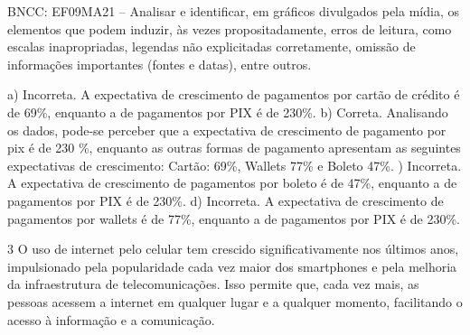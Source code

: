 \begin{escolha}
\begin{boxmedio}
\begin{boxmedio}
{\begin{boxpeq}
\begin{boxpeq}
{\begin{boxpeq}
\begin{boxmedio}
\begin{boxmedio}
\begin{boxpeq}
\begin{boxmedio}
\begin{boxpeq}
\begin{boxpeq}
\begin{boxpeq}
\begin{boxpeq}
\begin{boxmedio}
{\begin{boxmedio}
\begin{boxmedio}
\begin{boxpeq}
\begin{boxmedio}
\begin{boxpeq}
\begin{boxpeq}
\begin{boxpeq}
\begin{escolha}
{\begin{boxmedio}
\begin{boxpeq}
\begin{boxpeq}
\begin{boxpeq}
\begin{boxpeq}
\begin{boxpeq}
\begin{boxmedio}
\begin{boxpeq}
\begin{boxpeq}
\begin{boxpeq}
{\begin{boxpeq}
\begin{boxmedio}
\begin{boxpeq}
\begin{boxpeq}
\begin{boxpeq}
{\begin{boxpeq}
\begin{boxmedio}
{\begin{boxpeq}
\begin{boxpeq}
\begin{boxmedio}
\begin{boxmedio}
\begin{boxpeq}
\begin{boxpeq}
{\begin{boxpeq}
\begin{boxpeq}
\begin{boxpeq}
\begin{boxpeq}
\begin{boxpeq}
\begin{escolha}
\begin{escolha}
{\begin{boxmedio}
\begin{boxpeq}
\begin{q°}
\begin{boxmedio}
\begin{boxpeq}
\begin{boxpeq}
\begin{boxmedio}
\begin{boxmedio}
\begin{boxmedio}
\begin{boxmedio}
{BNCC: EF09MA21 -- Analisar e identificar, em gráficos divulgados pela mídia, os elementos que podem induzir, às vezes propositadamente, erros de leitura, como escalas inapropriadas, legendas não explicitadas corretamente, omissão de informações importantes (fontes e datas), entre outros.

a) Incorreta. A expectativa de crescimento de pagamentos por cartão de crédito é de 69\%, 
enquanto a de pagamentos por PIX é de 230\%.
b) Correta. Analisando os dados, pode-se perceber que a expectativa de crescimento de
pagamento por pix é de 230 \%, enquanto as outras formas de pagamento apresentam
as seguintes expectativas de crescimento: Cartão: 69\%, Wallets 77\% e Boleto 47\%.
) Incorreta. A expectativa de crescimento de pagamentos por boleto é de 47\%, enquanto
a de pagamentos por PIX é de 230\%.
d) Incorreta. A expectativa de crescimento de pagamentos por wallets é de 77\%, enquanto
a de pagamentos por PIX é de 230\%.}

\num{3} O uso de internet pelo celular tem crescido significativamente nos
últimos anos, impulsionado pela popularidade cada vez maior dos
smartphones e pela melhoria da infraestrutura de telecomunicações. Isso
permite que, cada vez mais, as pessoas acessem a internet em qualquer lugar e a qualquer
momento, facilitando o acesso à informação e a comunicação.


\end{boxmedio}
\end{boxmedio}
\end{boxmedio}
\end{boxmedio}
\end{boxpeq}
\end{boxpeq}
\end{boxmedio}
\end{q°}
\end{boxpeq}
\end{boxmedio}}
\end{escolha}
\end{escolha}
\end{boxpeq}
\end{boxpeq}
\end{boxpeq}
\end{boxpeq}
\end{boxpeq}}
\end{boxpeq}
\end{boxpeq}
\end{boxmedio}
\end{boxmedio}
\end{boxpeq}
\end{boxpeq}}
\end{boxmedio}
\end{boxpeq}}
\end{boxpeq}
\end{boxpeq}
\end{boxpeq}
\end{boxmedio}
\end{boxpeq}}
\end{boxpeq}
\end{boxpeq}
\end{boxpeq}
\end{boxmedio}
\end{boxpeq}
\end{boxpeq}
\end{boxpeq}
\end{boxpeq}
\end{boxpeq}
\end{boxmedio}}
\end{escolha}
\end{boxpeq}
\end{boxpeq}
\end{boxpeq}
\end{boxmedio}
\end{boxpeq}
\end{boxmedio}
\end{boxmedio}}
\end{boxmedio}
\end{boxpeq}
\end{boxpeq}
\end{boxpeq}
\end{boxpeq}
\end{boxmedio}
\end{boxpeq}
\end{boxmedio}
\end{boxmedio}
\end{boxpeq}}
\end{boxpeq}
\end{boxpeq}}
\end{boxmedio}
\end{boxmedio}
\end{escolha}
